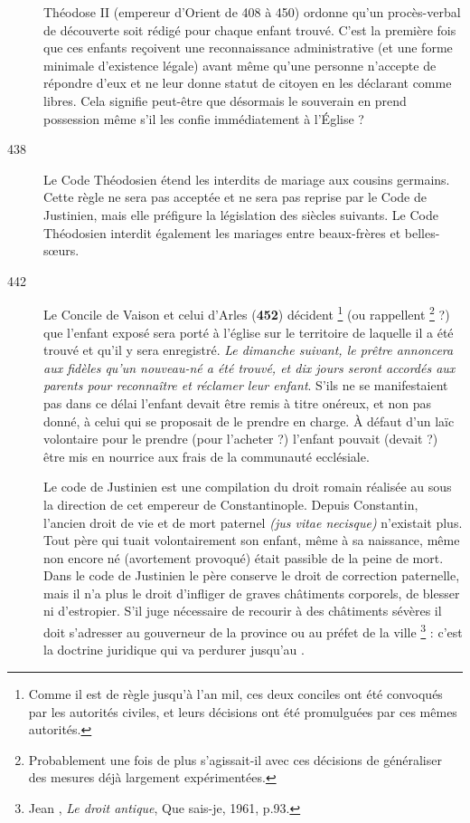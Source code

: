 \begin{description}
 Théodose II (empereur d'Orient de 408 à 450) ordonne qu'un procès-verbal de découverte soit rédigé pour chaque enfant trouvé. C'est la première fois que ces enfants reçoivent une reconnaissance administrative (et une forme minimale d'existence légale) avant même qu'une personne n'accepte de répondre d'eux et ne leur donne statut de citoyen en les déclarant comme libres. Cela signifie peut-être que désormais le souverain en prend possession même s'il les confie immédiatement à l'Église ? 

\item[438] Le Code Théodosien étend les interdits de mariage aux cousins germains. Cette règle ne sera pas acceptée et ne sera pas reprise par le Code de Justinien, mais elle préfigure la législation des siècles suivants. Le Code Théodosien interdit également les mariages entre beaux-frères et belles-sœurs.

\item[442] Le Concile de Vaison et celui d'Arles (\textbf{452})
décident%
\footnote{Comme il est de règle jusqu'à l'an mil, ces deux conciles ont été convoqués par les autorités civiles, et leurs décisions ont été promulguées par ces mêmes autorités.} 
(ou rappellent%
\footnote{Probablement une fois de plus s'agissait-il avec ces décisions de généraliser des mesures déjà largement expérimentées.} 
 ?) que l'enfant exposé sera porté à l'église sur le territoire de laquelle il a été trouvé et qu'il y sera enregistré. \emph{Le dimanche suivant, le prêtre annoncera aux fidèles qu'un nouveau-né a été trouvé, et dix jours seront accordés aux parents pour reconnaître et réclamer leur enfant}. S'ils ne se manifestaient pas dans ce délai l'enfant devait être remis à titre onéreux, et non pas donné, à celui qui se proposait de le prendre en charge. À défaut d'un laïc volontaire pour le prendre (pour l'acheter ?) l'enfant pouvait (devait ?) être mis en nourrice aux frais de la communauté ecclésiale. 

 Le code de Justinien est une compilation du droit romain réalisée au  sous la direction de cet empereur de Constantinople. Depuis Constantin, l'ancien droit de vie et de mort paternel \emph{(jus vitae necisque)} n'existait plus. Tout père qui tuait volontairement son enfant, même à sa naissance, même non encore né (avortement provoqué) était passible de la peine de mort. Dans le code de Justinien le père conserve le droit de correction paternelle, mais il n'a plus le droit d'infliger de graves châtiments corporels, de blesser ni d'estropier. S'il juge nécessaire de recourir à des châtiments sévères il doit s'adresser au gouverneur de la province ou au préfet de la ville%
\footnote{Jean , \emph{Le droit antique}, Que sais-je, 1961, p.93.} 
 : c'est la doctrine juridique qui va perdurer jusqu'au . 


\end{description}
